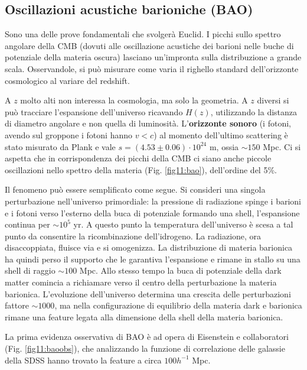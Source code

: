 \subsection{Oscillazioni acustiche barioniche (BAO)}
Sono una delle prove fondamentali che svolgerà Euclid. I picchi sullo spettro angolare della CMB (dovuti alle oscillazione acustiche dei barioni nelle buche di potenziale della materia oscura) lasciano un'impronta sulla distribuzione a grande scala. Osservandole, si può misurare come varia il righello standard dell'orizzonte cosmologico al variare del redshift. 

A $z$ molto alti non interessa la cosmologia, ma solo la geometria. A $z$ diversi si può tracciare l'espansione dell'universo ricavando $H(z)$, utilizzando la distanza di diametro angolare e non quella di luminosità. L'\textbf{orizzonte sonoro} (i fotoni, avendo sul groppone i fotoni hanno $v<c$) al momento dell'ultimo scattering è stato misurato da Plank e vale $s=(4.53\pm 0.06)\cdot 10^{24}$ m, ossia $\sim 150$ Mpc.
Ci si aspetta che in corrispondenza dei picchi della CMB ci siano anche piccole oscillazioni nello spettro della materia (Fig. \ref{fig11:bao}), dell'ordine del 5\%. 

Il fenomeno può essere semplificato come segue. Si consideri una singola perturbazione nell'universo primordiale: la pressione di radiazione spinge i barioni e i fotoni verso l'esterno della buca di potenziale formando una shell, l'espansione continua per $\sim 10^5$ yr. A questo punto la temperatura dell'universo è scesa a tal punto da consentire la ricombinazione dell'idrogeno. La radiazione, ora disaccoppiata, fluisce via e si omogenizza. La distribuzione di materia barionica ha quindi perso il supporto che le garantiva l'espansione e rimane in stallo su una shell di raggio $\sim 100$ Mpc. Allo stesso tempo la buca di potenziale della dark matter comincia a richiamare verso il centro della perturbazione la materia barionica. L'evoluzione dell'universo determina una crescita delle perturbazioni fattore $\sim 1000$, ma nella configurazione di equilibrio della materia dark e barionica rimane una feature legata alla dimensione della shell della materia barionica. 

La prima evidenza osservativa di BAO è ad opera di Eisenstein e collaboratori (Fig. \ref{fig11:baoobs}), che analizzando la funzione di correlazione delle galassie della SDSS hanno trovato la feature a circa $100 h^{-1}$ Mpc.

